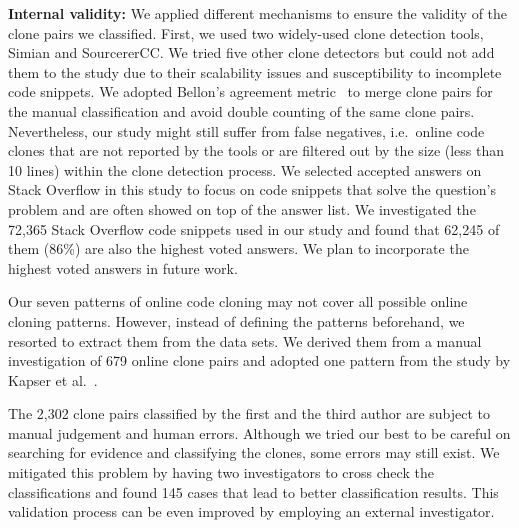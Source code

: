 \documentclass[10pt,journal,compsoc]{IEEEtran}
\begin{document}
\textbf{Internal validity:} 
We applied different mechanisms to ensure the validity of the clone pairs we
classified.  First, we used two widely-used clone detection tools, Simian and
SourcererCC.  We tried five other clone detectors but could not add them to the
study due to their scalability issues and susceptibility to incomplete code
snippets. We adopted Bellon's agreement metric~\cite{Bellon2007} to merge clone
pairs for the manual classification and avoid double counting of the same clone
pairs. Nevertheless, our study might still suffer from false negatives,
i.e.~online code clones that are not reported by the tools or are filtered out
by the size (less than 10 lines) within the clone detection process. We selected
accepted answers on Stack Overflow in this study to focus on code snippets that
solve the question's problem and are often showed on top of the answer list.
We investigated the 72,365 Stack Overflow code snippets used in our study and
found that 62,245 of them (86\%) are also the highest voted answers.
We plan to incorporate the highest voted answers in future work.



Our seven patterns of online code cloning may not cover all possible online
cloning patterns. However, instead of defining the patterns beforehand, we
resorted to extract them from the data sets. We derived them from a manual
investigation of 679 online clone pairs and adopted one pattern from the study
by Kapser et al.~\cite{Kapser2003}.

The 2,302 clone pairs classified by the first and the third author are subject
to manual judgement and human errors.  Although we tried our best to be careful
on searching for evidence and classifying the clones, some errors may still
exist. We mitigated this problem by having two investigators to cross check the
classifications and found 145 cases that lead to better classification results.
This validation process can be even improved by employing an external
investigator. 
\end{document}

